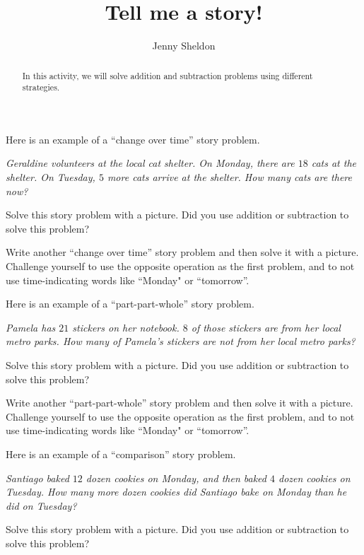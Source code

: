 \documentclass{ximera}
\title{Tell me a story!}
\author{Jenny Sheldon}
\begin{document}
\begin{abstract} In this activity, we will solve addition and subtraction problems using different strategies. \end{abstract}
\maketitle



\begin{problem}
Here is an example of a ``change over time'' story problem. 

\emph{Geraldine volunteers at the local cat shelter. On Monday, there are $18$ cats at the shelter. On Tuesday, $5$ more cats arrive at the shelter. How many cats are there now?}

Solve this story problem with a picture. Did you use addition or subtraction to solve this problem?
\end{problem}

\begin{problem}
Write another ``change over time'' story problem and then solve it with a picture. Challenge yourself to use the opposite operation as the first problem, and to not use time-indicating words like ``Monday" or ``tomorrow''.
\end{problem}


\begin{problem}
Here is an example of a ``part-part-whole'' story problem. 

\emph{Pamela has $21$ stickers on her notebook. $8$ of those stickers are from her local metro parks. How many of Pamela's stickers are not from her local metro parks?}

Solve this story problem with a picture. Did you use addition or subtraction to solve this problem?
\end{problem}

\begin{problem}
Write another ``part-part-whole'' story problem and then solve it with a picture. Challenge yourself to use the opposite operation as the first problem, and to not use time-indicating words like ``Monday" or ``tomorrow''.
\end{problem}

\begin{problem}
Here is an example of a ``comparison'' story problem. 

\emph{Santiago baked $12$ dozen cookies on Monday, and then baked $4$ dozen cookies on Tuesday. How many more dozen cookies did Santiago bake on Monday than he did on Tuesday?}

Solve this story problem with a picture. Did you use addition or subtraction to solve this problem?
\end{problem}
\end{document}
